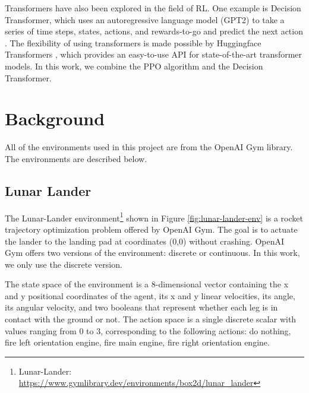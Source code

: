 \documentclass[conference]{IEEEtran}
\begin{document}
Transformers have also been explored in the field of RL. One example is Decision Transformer, which uses an autoregressive language model (GPT2) to take a series of time steps, states, actions, and rewards-to-go and predict the next action \cite{radford2019language,chen2021decision}. The flexibility of using transformers is made possible by Huggingface Transformers \cite{wolf2019huggingface}, which provides an easy-to-use API for state-of-the-art transformer models. In this work, we combine the PPO algorithm and the Decision Transformer.

\section{Background}
All of the environments used in this project are from the OpenAI Gym library\cite{brockman2016openai}. The environments are described below.

\subsection{Lunar Lander}

The Lunar-Lander environment\footnote{ Lunar-Lander: \url{https://www.gymlibrary.dev/environments/box2d/lunar_lander}} shown in Figure \ref{fig:lunar-lander-env} is a rocket trajectory optimization problem offered by OpenAI Gym. The goal is to actuate the lander to the landing pad at coordinates (0,0) without crashing. OpenAI Gym offers two versions of the environment: discrete or continuous. In this work, we only use the discrete version.

The state space of the environment is a 8-dimensional vector containing the x and y positional coordinates of the agent, its x and y linear velocities, its angle, its angular velocity, and two booleans that represent whether each leg is in contact with the ground or not. The action space is a single discrete scalar with values ranging from 0 to 3, corresponding to the following actions: do nothing, fire left orientation engine, fire main engine, fire right orientation engine.
\end{document}
